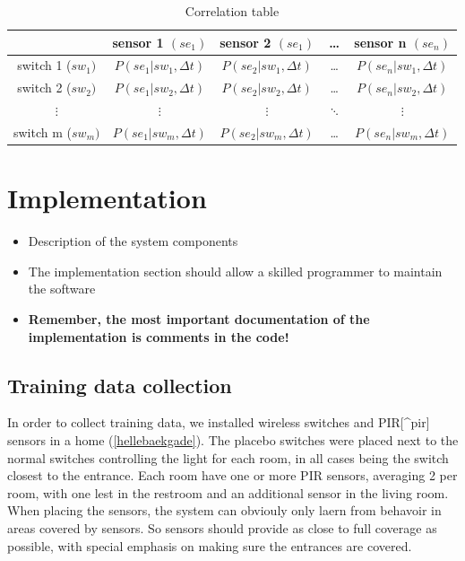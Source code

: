 \begin{table}[htbp]
\begin{minipage}{\linewidth}
\setlength{\tymax}{0.5\linewidth}
\centering
\small
\caption{Correlation table}
\label{ctable}
\begin{tabulary}{\textwidth}{@{}ccccc@{}} \toprule
&sensor 1 $(se_1)$&sensor 2 $(se_1)$&{\ldots}&sensor n $(se_n)$\\
\midrule
switch 1 ($sw_1)$&$P(se_1 | sw_1, \Delta t)$&$P(se_2 | sw_1, \Delta t)$&{\ldots}&$P(se_n | sw_1, \Delta t)$\\
switch 2 ($sw_2)$&$P(se_1 | sw_2, \Delta t)$&$P(se_2 | sw_2, \Delta t)$&{\ldots}&$P(se_n | sw_2, \Delta t)$\\
$\vdots$&$\vdots$&$\vdots$&$\ddots$&$\vdots$\\
switch m ($sw_m)$&$P(se_1 | sw_m, \Delta t)$&$P(se_2 | sw_m, \Delta t)$&{\ldots}&$P(se_n | sw_m, \Delta t)$\\

\bottomrule

\end{tabulary}
\end{minipage}
\end{table}


\chapter{Implementation}
\label{implementation}

\begin{itemize}
\item Description of the system components

\item The implementation section should allow a skilled programmer to maintain the software

\item \textbf{Remember, the most important documentation of the implementation is comments in the code!}

\end{itemize}

\section{Training data collection}
\label{trainingdatacollection}

In order to collect training data, we installed wireless switches and PIR[\^{}pir] sensors in a home (\autoref{hellebaekgade}). The placebo switches were placed next to the normal switches controlling the light for each room, in all cases being the switch closest to the entrance. Each room have one or more PIR sensors, averaging 2 per room, with one lest in the restroom and an additional sensor in the living room. When placing the sensors, the system can obviouly only laern from behavoir in areas covered by sensors. So sensors should provide as close to full coverage as possible, with special emphasis on making sure the entrances are covered.

